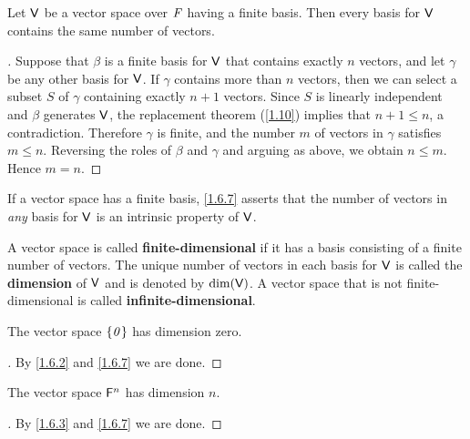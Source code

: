 \begin{cor}\label{1.6.7}
  Let \(\mathsf{V}\) be a vector space over \(\mathit{F}\) having a finite basis.
  Then every basis for \(\mathsf{V}\) contains the same number of vectors.
\end{cor}

\begin{proof}[]
  Suppose that \(\beta\) is a finite basis for \(\mathsf{V}\) that contains exactly \(n\) vectors, and let \(\gamma\) be any other basis for \(\mathsf{V}\).
  If \(\gamma\) contains more than \(n\) vectors, then we can select a subset \(S\) of \(\gamma\) containing exactly \(n + 1\) vectors.
  Since \(S\) is linearly independent and \(\beta\) generates \(\mathsf{V}\), the replacement theorem (\cref{1.10}) implies that \(n + 1 \leq n\), a contradiction.
  Therefore \(\gamma\) is finite, and the number \(m\) of vectors in \(\gamma\) satisfies \(m \leq n\).
  Reversing the roles of \(\beta\) and \(\gamma\) and arguing as above, we obtain \(n \leq m\).
  Hence \(m = n\).
\end{proof}

\begin{note}
  If a vector space has a finite basis, \cref{1.6.7} asserts that the number of vectors in \emph{any} basis for \(\mathsf{V}\) is an intrinsic property of \(\mathsf{V}\).
\end{note}

\begin{defn}\label{1.6.8}
  A vector space is called \textbf{finite-dimensional} if it has a basis consisting of a finite number of vectors.
  The unique number of vectors in each basis for \(\mathsf{V}\) is called the \textbf{dimension} of \(\mathsf{V}\) and is denoted by \(\dim(\mathsf{V})\).
  A vector space that is not finite-dimensional is called \textbf{infinite-dimensional}.
\end{defn}

\begin{eg}\label{1.6.9}
  The vector space \(\left\lbrace\mathit{0}\right\rbrace\) has dimension zero.
\end{eg}

\begin{proof}[]
  By \cref{1.6.2} and \cref{1.6.7} we are done.
\end{proof}

\begin{eg}\label{1.6.10}
  The vector space \(\mathsf{F}^n\) has dimension \(n\).
\end{eg}

\begin{proof}[]
  By \cref{1.6.3} and \cref{1.6.7} we are done.
\end{proof}

